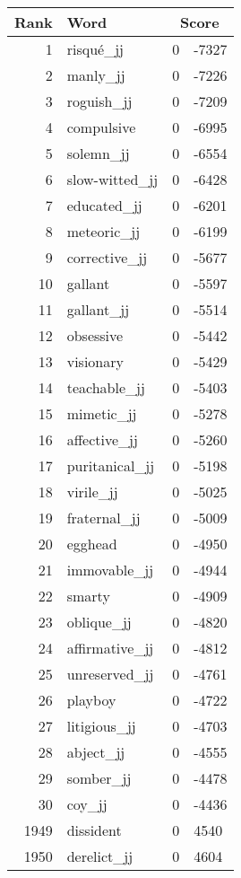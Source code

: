 \begin{longtable}[!htbp]{| rlr@{.}l |}
    \hline
    \textbf{Rank} & \textbf{Word} & \multicolumn{2}{c|}{\textbf{Score}} \\
    \hline
    \endhead
    1 & risqué\_jj & 0 & -7327 \\
    2 & manly\_jj & 0 & -7226 \\
    3 & roguish\_jj & 0 & -7209 \\
    4 & compulsive & 0 & -6995 \\
    5 & solemn\_jj & 0 & -6554 \\
    6 & slow-witted\_jj & 0 & -6428 \\
    7 & educated\_jj & 0 & -6201 \\
    8 & meteoric\_jj & 0 & -6199 \\
    9 & corrective\_jj & 0 & -5677 \\
    10 & gallant & 0 & -5597 \\
    11 & gallant\_jj & 0 & -5514 \\
    12 & obsessive & 0 & -5442 \\
    13 & visionary & 0 & -5429 \\
    14 & teachable\_jj & 0 & -5403 \\
    15 & mimetic\_jj & 0 & -5278 \\
    16 & affective\_jj & 0 & -5260 \\
    17 & puritanical\_jj & 0 & -5198 \\
    18 & virile\_jj & 0 & -5025 \\
    19 & fraternal\_jj & 0 & -5009 \\
    20 & egghead & 0 & -4950 \\
    21 & immovable\_jj & 0 & -4944 \\
    22 & smarty & 0 & -4909 \\
    23 & oblique\_jj & 0 & -4820 \\
    24 & affirmative\_jj & 0 & -4812 \\
    25 & unreserved\_jj & 0 & -4761 \\
    26 & playboy & 0 & -4722 \\
    27 & litigious\_jj & 0 & -4703 \\
    28 & abject\_jj & 0 & -4555 \\
    29 & somber\_jj & 0 & -4478 \\
    30 & coy\_jj & 0 & -4436 \\
    1949 & dissident & 0 & 4540 \\
    1950 & derelict\_jj & 0 & 4604 \\

\end{longtable}
